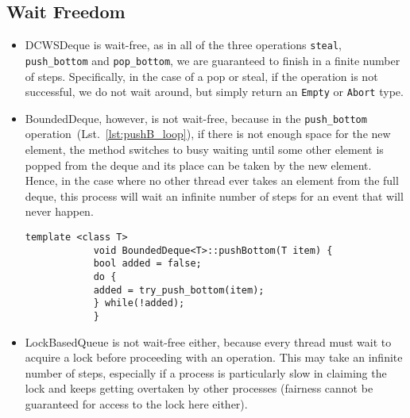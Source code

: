 \documentclass [10pt]{scrartcl}
\begin{document}
   \subsection{Wait Freedom}
   \begin{itemize}
      \item DCWSDeque is wait-free, as in all of the three operations \texttt{steal}, \texttt{push\_bottom} and \texttt{pop\_bottom}, we are guaranteed to finish in a finite number of steps. Specifically, in the case of a pop or steal, if the operation is not successful, we do not wait around, but simply return an \texttt{Empty} or \texttt{Abort} type.
      
      \item BoundedDeque, however, is not wait-free, because in the \texttt{push\_bottom} operation~(Lst.~\ref{lst:pushB_loop}), if there is not enough space for the new element, the method switches to busy waiting until some other element is popped from the deque and its place can be taken by the new element. Hence, in the case where no other thread ever takes an element from the full deque, this process will wait an infinite number of steps for an event that will never happen.
      
      \begin{center}
         \begin{minipage}{.9\textwidth}
            \begin{lstlisting}[caption={\texttt{pushBottom} keeps trying to add the item until it succeeds}, label={lst:pushB_loop}]
            template <class T>
            void BoundedDeque<T>::pushBottom(T item) {
            bool added = false;
            do {
            added = try_push_bottom(item);
            } while(!added);
            }
            \end{lstlisting}
         \end{minipage}
      \end{center}
      
      \item LockBasedQueue is not wait-free either, because every thread must wait to acquire a lock before proceeding with an operation. This may take an infinite number of steps, especially if a process is particularly slow in claiming the lock and keeps getting overtaken by other processes (fairness cannot be guaranteed for access to the lock here either).
   \end{itemize}
   
\end{document}
